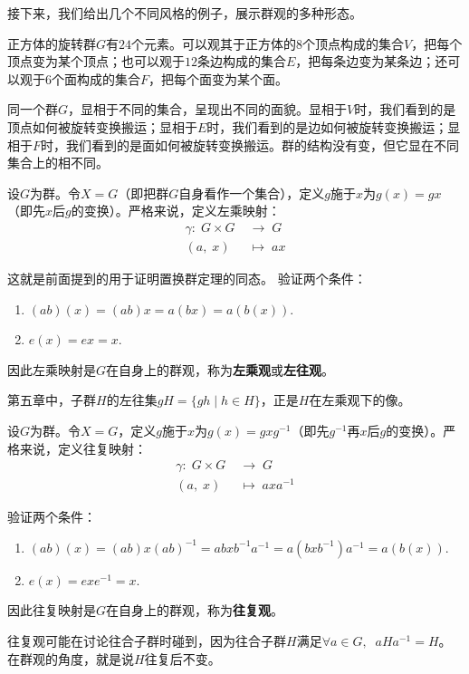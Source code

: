 \documentclass[12pt,UTF8,fontset=none]{ctexbook}
\begin{document}
接下来，我们给出几个不同风格的例子，展示群观的多种形态。

\begin{ex}[观正方体旋转群于顶点、边、面]
正方体的旋转群$G$有$24$个元素。可以观其于正方体的$8$个顶点构成的集合$V$，把每个顶点变为某个顶点；也可以观于$12$条边构成的集合$E$，把每条边变为某条边；还可以观于$6$个面构成的集合$F$，把每个面变为某个面。

同一个群$G$，显相于不同的集合，呈现出不同的面貌。显相于$V$时，我们看到的是顶点如何被旋转变换搬运；显相于$E$时，我们看到的是边如何被旋转变换搬运；显相于$F$时，我们看到的是面如何被旋转变换搬运。群的结构没有变，但它显在不同集合上的相不同。

\end{ex}

\begin{ex}
设$G$为群。令$X = G$（即把群$G$自身看作一个集合），定义$g$施于$x$为$g(x) = gx$（即先$x$后$g$的变换）。严格来说，定义左乘映射：
\begin{align*}
    \gamma:\; G\times G\;&\longrightarrow \; G\\
    (a, \;x)\;&\longmapsto\; ax
\end{align*}

这就是前面提到的用于证明置换群定理的同态。
验证两个条件：
\begin{enumerate}
    \item $(ab)(x) = (ab)x = a(bx) = a(b(x)).$
    \item $e(x) = ex = x.$
\end{enumerate}
因此左乘映射是$G$在自身上的群观，称为\textbf{左乘观}或\textbf{左往观}。

第五章中，子群$H$的左往集$gH = \{gh \mid h \in H\}$，正是$H$在左乘观下的像。
\end{ex}

\begin{ex}
    设$G$为群。令$X = G$，定义$g$施于$x$为$g(x) = gxg^{-1}$（即先$g^{-1}$再$x$后$g$的变换）。严格来说，定义往复映射：
\begin{align*}
    \gamma:\; G\times G\;&\longrightarrow \; G\\
    (a,\; x)\;&\longmapsto\; axa^{-1}
\end{align*}

验证两个条件：
\begin{enumerate}
    \item $(ab)(x) = (ab)x(ab)^{-1} = abxb^{-1}a^{-1} = a(bxb^{-1})a^{-1} = a(b(x)).$
    \item $e(x) = exe^{-1} = x.$
\end{enumerate}
因此往复映射是$G$在自身上的群观，称为\textbf{往复观}。

往复观可能在讨论往合子群时碰到，因为往合子群$H$满足$\forall a\in G, \;\;aHa^{-1} = H$。在群观的角度，就是说$H$往复后不变。
\end{ex}
\end{document}
